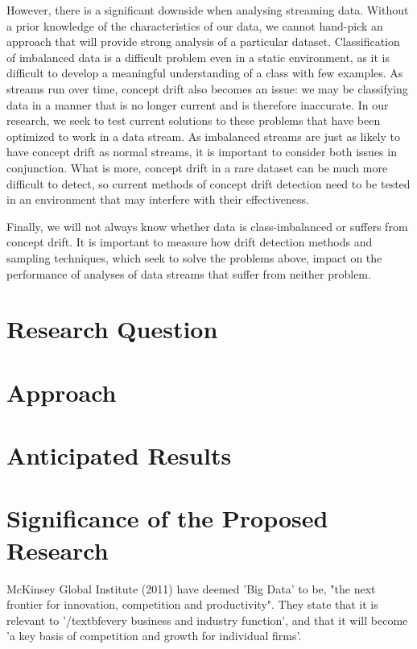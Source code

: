 \documentclass[11pt]{article}\usepackage[]{graphicx}\usepackage[]{color}
\begin{document}
However, there is a significant downside when analysing streaming data. Without a prior knowledge of the characteristics of our data, we cannot hand-pick an approach that will provide strong analysis of a particular dataset. Classification of imbalanced data is a difficult problem even in a static environment, as it is difficult to develop a meaningful understanding of a class with few examples. As streams run over time, concept drift also becomes an issue: we may be classifying data in a manner that is no longer current and is therefore inaccurate. In our research, we seek to test current solutions to these problems that have been optimized to work in a data stream. As imbalanced streams are just as likely to have concept drift as normal streams, it is important to consider both issues in conjunction. What is more, concept drift in a rare dataset can be much more difficult to detect, so current methods of concept drift detection need to be tested in an environment that may interfere with their effectiveness.

Finally, we will not always know whether data is class-imbalanced or suffers from concept drift. It is important to measure how drift detection methods and sampling techniques, which seek to solve the problems above, impact on the performance of analyses of data streams that suffer from neither problem.

\section{Research Question}

\section{Approach}

\section{Anticipated Results}

\section{Significance of the Proposed Research}

McKinsey Global Institute (2011) have deemed 'Big Data' to be, "the next frontier for innovation, competition and productivity". They state that it is relevant to '/textbf{every} business and industry function', and that it will become 'a key basis of competition and growth for individual firms'.
\end{document}
